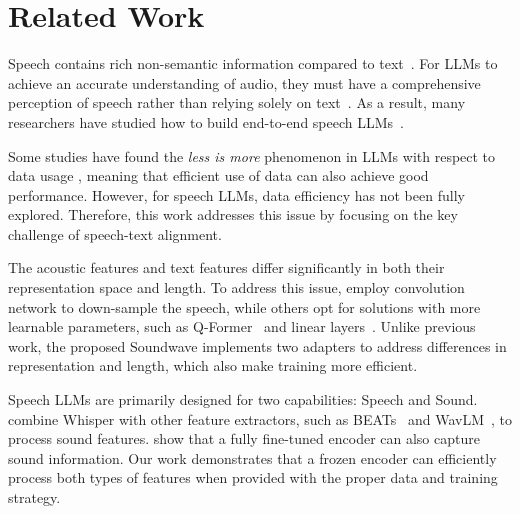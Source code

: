 \section{Related Work}
Speech contains rich non-semantic information compared to text~\citep{audiobench, bu2024roadmap, dynamic_superb}. For LLMs to achieve an accurate understanding of audio, they must have a comprehensive perception of speech rather than relying solely on text~\citep{ji2024wavchat, sdeval}. As a result, many researchers have studied how to build end-to-end speech LLMs~\citep{wavllm, SALMONN, qwen2audio, GAMA, fang2024llama, geng2025osum}. 

Some studies have found the \textit{less is more} phenomenon in LLMs with respect to data usage \citep{zhou2024lima,song-etal-2025-less}, meaning that efficient use of data can also achieve good performance. However, for speech LLMs, data efficiency has not been fully explored. Therefore, this work addresses this issue by focusing on the key challenge of speech-text alignment.

The acoustic features and text features differ significantly in both their representation space and length. To address this issue, \citet{qwen2audio, qwenaudio} employ convolution network to down-sample the speech, while others opt for solutions with more learnable parameters, such as Q-Former~\citep{SALMONN} and linear layers~\citep{wavllm}. Unlike previous work, the proposed Soundwave implements two adapters to address differences in representation and length, which also make training more efficient.


Speech LLMs are primarily designed for two capabilities: Speech and Sound. \citet{SALMONN,wavllm} combine Whisper with other feature extractors, such as BEATs~\citep{BEATs} and WavLM~\citep{WavLM}, to process sound features. 
\citet{qwen2audio} show that a fully fine-tuned encoder can also capture sound information. Our work demonstrates that a frozen encoder can efficiently process both types of features when provided with the proper data and training strategy.